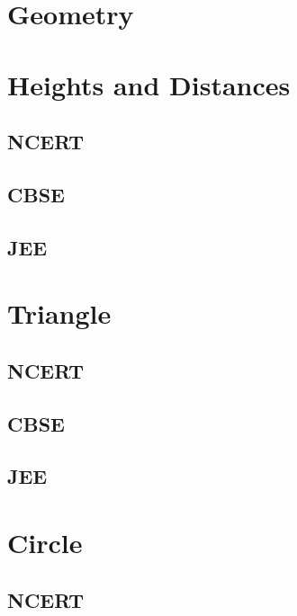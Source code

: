 \documentclass[journal]{IEEEtran}
\begin{document}
\newpage


\tableofcontents

\newpage
\onecolumn


\renewcommand{\thetable}{\theenumi}

\section{Geometry}

\section{Heights and Distances}
\subsection{NCERT}

\subsection{CBSE}

\subsection{JEE}

%
\section{Triangle}
\subsection{NCERT}

\subsection{CBSE}

\subsection{JEE}
 
\section{Circle}
\subsection{NCERT}

\end{document}

